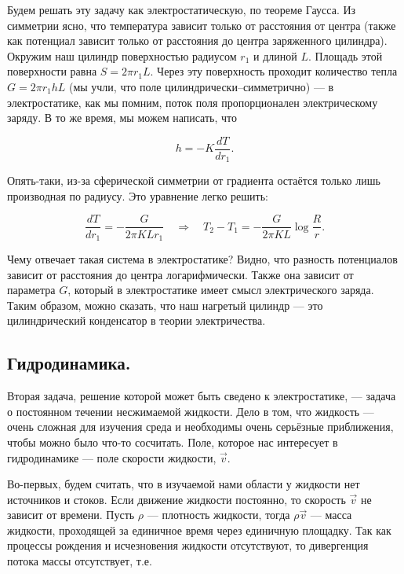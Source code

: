 \documentclass[11pt,a4paper]{article}
\numberwithin{equation}{section}
\begin{document}
Будем решать эту задачу как электростатическую, по теореме Гаусса. Из
симметрии ясно, что температура зависит только от расстояния от центра
(также как потенциал зависит только от расстояния до центра
заряженного цилиндра). Окружим наш цилиндр поверхностью радиусом $r_1$
и длиной $L$. Площадь этой поверхности равна $S = 2\pi r_1 L$. Через
эту поверхность проходит количество тепла $G = 2\pi r_1 h L$ (мы учли,
что поле цилиндрически--симметрично) --- в электростатике, как мы
помним, поток поля пропорционален электрическому заряду. В то же
время, мы можем написать, что

\begin{equation}
  \label{eq:heated_cylinder_1}
  h = -K \frac{dT}{dr_1}.
\end{equation}

Опять-таки, из-за сферической симметрии от градиента остаётся только
лишь производная по радиусу. Это уравнение легко решить: 

\begin{equation}
  \label{eq:heated_cylinder_2}
  \frac{dT}{dr_1} = -\frac{G}{2\pi K L r_1} \quad \Rightarrow \quad T_2 - T_1 =
  -\frac{G}{2\pi K L} \log \frac{R}{r}.
\end{equation}

Чему отвечает такая система в электростатике? Видно, что разность
потенциалов зависит от расстояния до центра логарифмически. Также она
зависит от параметра $G$, который в электростатике имеет смысл
электрического заряда. Таким образом, можно сказать, что наш нагретый
цилиндр --- это цилиндрический конденсатор в теории электричества.

\subsection{Гидродинамика.}
\label{sec:hydro}

Вторая задача, решение которой может быть сведено к электростатике,
--- задача о постоянном течении несжимаемой жидкости. Дело в том, что
жидкость --- очень сложная для изучения среда и необходимы очень
серьёзные приближения, чтобы можно было что-то сосчитать. Поле,
которое нас интересует в гидродинамике --- поле скорости жидкости,
$\vec{v}$. 

Во-первых, будем считать, что в изучаемой нами области у жидкости нет
источников и стоков. Если движение жидкости постоянно, то скорость
$\vec{v}$ не зависит от времени. Пусть $\rho$ --- плотность жидкости,
тогда $\rho \vec{v}$ --- масса жидкости, проходящей за единичное время
через единичную площадку. Так как процессы рождения и исчезновения
жидкости отсутствуют, то дивергенция потока массы отсутствует, т.е.
\end{document}
